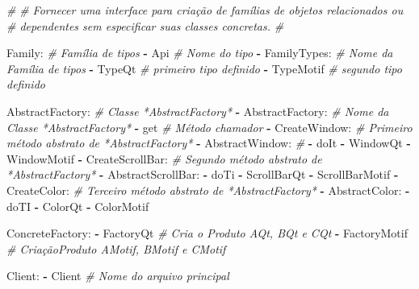 \documentclass[]{article}
\newenvironment{Shaded}{}{}
\newcommand{\KeywordTok}[1]{\textcolor[rgb]{0.00,0.44,0.13}{\textbf{{#1}}}}
\newcommand{\CommentTok}[1]{\textcolor[rgb]{0.38,0.63,0.69}{\textit{{#1}}}}
\newcommand{\FunctionTok}[1]{\textcolor[rgb]{0.02,0.16,0.49}{{#1}}}
\newcommand{\NormalTok}[1]{{#1}}
\begin{document}
\begin{Shaded}
\begin{Highlighting}[]
\CommentTok{#}
\CommentTok{# Fornecer uma interface para criação de famílias de objetos relacionados ou}
\CommentTok{# dependentes sem especificar suas classes concretas.}
\CommentTok{#}

\FunctionTok{Family:}                      \CommentTok{# Família de tipos}
\KeywordTok{-} \NormalTok{Api                        }\CommentTok{# Nome do tipo}
\KeywordTok{-} \FunctionTok{FamilyTypes:}               \CommentTok{# Nome da Família de tipos}
    \KeywordTok{-} \NormalTok{TypeQt                 }\CommentTok{# primeiro tipo definido}
    \KeywordTok{-} \NormalTok{TypeMotif              }\CommentTok{# segundo tipo definido}

\FunctionTok{AbstractFactory:}             \CommentTok{# Classe *AbstractFactory* }
\KeywordTok{-} \FunctionTok{AbstractFactory:}           \CommentTok{# Nome da Classe *AbstractFactory*}
    \KeywordTok{-} \NormalTok{get                    }\CommentTok{# Método chamador}
    \KeywordTok{-} \FunctionTok{CreateWindow:}          \CommentTok{# Primeiro método abstrato de *AbstractFactory*}
        \KeywordTok{-} \FunctionTok{AbstractWindow:}    \CommentTok{#}
            \KeywordTok{-} \NormalTok{doIt}
            \KeywordTok{-} \NormalTok{WindowQt}
            \KeywordTok{-} \NormalTok{WindowMotif}
    \KeywordTok{-} \FunctionTok{CreateScrollBar:}       \CommentTok{# Segundo método abstrato de *AbstractFactory*}
        \KeywordTok{-} \FunctionTok{AbstractScrollBar:}
            \KeywordTok{-} \NormalTok{doTi}
            \KeywordTok{-} \NormalTok{ScrollBarQt}
            \KeywordTok{-} \NormalTok{ScrollBarMotif}
    \KeywordTok{-} \FunctionTok{CreateColor:}           \CommentTok{# Terceiro método abstrato de *AbstractFactory*}
        \KeywordTok{-} \FunctionTok{AbstractColor:}
            \KeywordTok{-} \NormalTok{doTI}
            \KeywordTok{-} \NormalTok{ColorQt}
            \KeywordTok{-} \NormalTok{ColorMotif}

\FunctionTok{ConcreteFactory:}
\KeywordTok{-} \NormalTok{FactoryQt                  }\CommentTok{# Cria o Produto AQt, BQt e CQt}
\KeywordTok{-} \NormalTok{FactoryMotif               }\CommentTok{# CriaçãoProduto AMotif, BMotif e CMotif}

\FunctionTok{Client:}
\KeywordTok{-} \NormalTok{Client                     }\CommentTok{# Nome do arquivo principal}
\end{Highlighting}
\end{Shaded}
\end{document}
